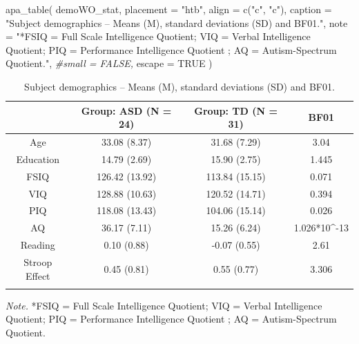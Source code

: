 \documentclass[
  11pt,
  english,
  ,doc,floatsintext]{apa6}
\newenvironment{Shaded}{}{}
\newcommand{\AttributeTok}[1]{\textcolor[rgb]{0.49,0.56,0.16}{#1}}
\newcommand{\CommentTok}[1]{\textcolor[rgb]{0.38,0.63,0.69}{\textit{#1}}}
\newcommand{\ConstantTok}[1]{\textcolor[rgb]{0.53,0.00,0.00}{#1}}
\newcommand{\FunctionTok}[1]{\textcolor[rgb]{0.02,0.16,0.49}{#1}}
\newcommand{\NormalTok}[1]{#1}
\newcommand{\StringTok}[1]{\textcolor[rgb]{0.25,0.44,0.63}{#1}}
\begin{document}
\begin{Shaded}
\begin{Highlighting}[]
\FunctionTok{apa\_table}\NormalTok{(}
\NormalTok{    demoWO\_stat,}
    \AttributeTok{placement =} \StringTok{"htb"}\NormalTok{,}
    \AttributeTok{align =} \FunctionTok{c}\NormalTok{(}\StringTok{"c"}\NormalTok{, }\StringTok{"c"}\NormalTok{),}
    \AttributeTok{caption =} \StringTok{"Subject demographics – Means (M), standard deviations (SD) and BF01."}\NormalTok{,}
    \AttributeTok{note =} \StringTok{"*FSIQ = Full Scale Intelligence Quotient; VIQ = Verbal Intelligence Quotient; PIQ = Performance Intelligence Quotient ; AQ = Autism{-}Spectrum Quotient."}\NormalTok{,}
    \CommentTok{\#small = FALSE,}
    \AttributeTok{escape =} \ConstantTok{TRUE}
\NormalTok{    )}
\end{Highlighting}
\end{Shaded}

\begin{table}[htb]

\begin{center}
\begin{threeparttable}

\caption{\label{tab:demoWO}Subject demographics – Means (M), standard deviations (SD) and BF01.}

\begin{tabular}{cccc}
\toprule
 & \multicolumn{1}{c}{Group: ASD (N = 24)} & \multicolumn{1}{c}{Group: TD (N = 31)} & \multicolumn{1}{c}{BF01}\\
\midrule
Age & 33.08 (8.37) & 31.68 (7.29) & 3.04\\
Education & 14.79 (2.69) & 15.90 (2.75) & 1.445\\
FSIQ & 126.42 (13.92) & 113.84 (15.15) & 0.071\\
VIQ & 128.88 (10.63) & 120.52 (14.71) & 0.394\\
PIQ & 118.08 (13.43) & 104.06 (15.14) & 0.026\\
AQ & 36.17 (7.11) & 15.26 (6.24) & 1.026*10\textasciicircum{}-13\\
Reading & 0.10 (0.88) & -0.07 (0.55) & 2.61\\
Stroop Effect & 0.45 (0.81) & 0.55 (0.77) & 3.306\\
\bottomrule
\addlinespace
\end{tabular}

\begin{tablenotes}[para]
\normalsize{\textit{Note.} *FSIQ = Full Scale Intelligence Quotient; VIQ = Verbal Intelligence Quotient; PIQ = Performance Intelligence Quotient ; AQ = Autism-Spectrum Quotient.}
\end{tablenotes}

\end{threeparttable}
\end{center}

\end{table}
\end{document}
